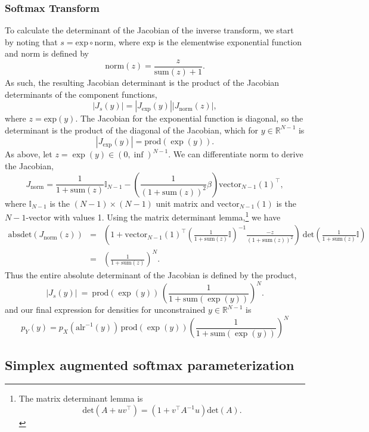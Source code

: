 \documentclass[11pt]{article}
\newcommand{\abs}[1]{\left| #1 \right|}
\newcommand{\absdet}[1]{\abs{#1}}
\begin{document}
\subsubsection{Softmax Transform}

To calculate the determinant of the Jacobian of the inverse transform,
we start by noting that $s = \textrm{exp} \circ \textrm{norm}$, where
$\textrm{exp}$ is the elementwise exponential function and
\textrm{norm} is defined by
\[
  \textrm{norm}(z) = \frac{z}{\textrm{sum}(z) + 1}.
\]
As such, the resulting Jacobian determinant is the product of the
Jacobian determinants of the component functions,
\[
  \absdet{J_s(y)}
  = \absdet{J_{\textrm{exp}}(y)} \absdet{J_{\textrm{norm}}(z)},
\]
where $z = \textrm{exp}(y)$.  The Jacobian for the exponential
function is diagonal, so the determinant is the product of the
diagonal of the Jacobian, which for $y \in \mathbb{R}^{N-1}$ is
\[
  \absdet{J_{\textrm{exp}}(y)} = \textrm{prod}(\exp(y)).
\]
As above, let $z = \exp(y) \in (0, \inf)^{N-1}$.  We can differentiate
$\textrm{norm}$ to derive the Jacobian,
\[
  J_{\textrm{norm}}
  = \frac{1}{1 + \textrm{sum}(z)} \mathbb{I}_{N-1}
  - \left(\frac{1}{(1 + \textrm{sum}(z))^2} \beta \right)
  \textrm{vector}_{N-1}(1)^{\top},
\]
where $\mathbb{I}_{N-1}$ is the $(N - 1) \times (N - 1)$ unit matrix and
$\textrm{vector}_{N-1}(1)$ is the $N - 1$-vector with values 1.  Using
the matrix determinant lemma,\footnote{The matrix determinant lemma
  is \[\textrm{det}(A + u v^{\top}) = (1 + v^{\top} A^{-1} u)
    \textrm{det}(A).\]}
we have
\begin{eqnarray*}
  \textrm{absdet}(J_{\textrm{norm}}(z))
  & = &
  \left(
    1
    + \textrm{vector}_{N-1}(1)^{\top}
    \left(\frac{1}{1 + \textrm{sum}(z)} \mathbb{I} \right)^{-1}
    \frac{-z}{(1 + \textrm{sum}(z))^2}
    \right)
    \ \textrm{det}\left(\frac{1}{1 + \textrm{sum}(z)} \mathbb{I}
        \right)
  \\[6pt]
  & = & \left( \frac{1}{1 + \textrm{sum}(z)} \right)^N.
\end{eqnarray*}
Thus the entire absolute determinant of the Jacobian is defined by the
product, 
\[
  \absdet{J_s(y)}
  \ = \
  \textrm{prod}(\exp(y))
  \, \left( \frac{1}{1 + \textrm{sum}(\exp(y))} \right)^N.
\]
and our final expression for densities for unconstrained $y \in
\mathbb{R}^{N-1}$ is
\[
  p_Y(y)
  = p_X(\textrm{alr}^{-1}(y))
  \, \textrm{prod}(\exp(y))
  \left( \frac{1}{1 + \textrm{sum}(\exp(y))} \right)^N
\]  



\subsection{Simplex augmented softmax parameterization}
\end{document}
